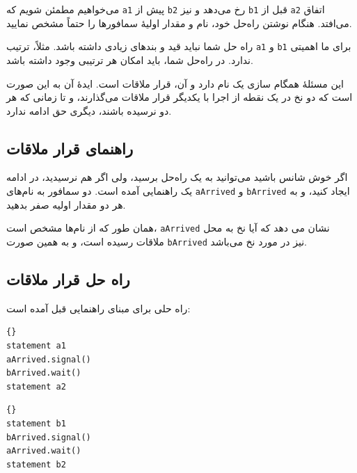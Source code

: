 \documentclass{book}
\newcommand{\clearemptydoublepage}{\newpage\cleardoublepage}
\begin{document}
%
می‌خواهیم مطمئن شویم که \texttt{a1} پیش از \texttt{b2} رخ می‌دهد و نیز \texttt{b1} قبل از \texttt{a2} اتفاق می‌افتد. 
هنگام نوشتن راه‌حل خود، نام و مقدار اولیهٔ سمافورها را حتماً مشخص نمایید.

راه حل شما نباید قید و بندهای زیادی داشته باشد. مثلاً، ترتیب \texttt{a1} و \texttt{b1} برای ما اهمیتی ندارد. 
در راه‌حل شما، باید امکان هر ترتیبی وجود داشته باشد.

این مسئلهٔ همگام سازی یک نام دارد و‌ آن، قرار ملاقات است. ایدهٔ آن به این صورت است که دو نخ در یک نقطه از اجرا با یکدیگر قرار ملاقات می‌گذارند، 
و تا زمانی که هر دو نرسیده باشند، دیگری حق ادامه ندارد.


 \clearemptydoublepage
\subsection{راهنمای قرار ملاقات}
	

اگر خوش شانس باشید می‌توانید به یک راه‌حل برسید، ولی اگر هم نرسیدید، در ادامه یک راهنمایی آمده است. 
دو سمافور به نام‌های \texttt{aArrived} و \texttt{bArrived} ایجاد کنید، و به هر دو مقدار اولیه صفر بدهید. 

همان طور که از نام‌ها مشخص است، \texttt{aArrived} نشان می دهد که آیا نخ  به محل ملاقات رسیده است، 
و به همین صورت \texttt{bArrived} نیز در مورد نخ  می‌باشد.

\clearemptydoublepage
\subsection{راه حل قرار ملاقات }

    راه حلی برای مبنای راهنمایی قبل آمده است: 

\begin{latin}
\begin{minipage}[t]{2in}
\begin{latin}
\begin{lstlisting}[title=\rl{نخ \lr{A}}]{}
statement a1
aArrived.signal()
bArrived.wait()
statement a2
\end{lstlisting}
\end{latin}
\end{minipage}
\hfill
\begin{minipage}[t]{2in}
\begin{latin}
\begin{lstlisting}[title=\rl{نخ \lr{B}}]{}
statement b1
bArrived.signal()
aArrived.wait()
statement b2
\end{lstlisting}
\end{latin}
\end{minipage}
\end{latin}
\end{document}

